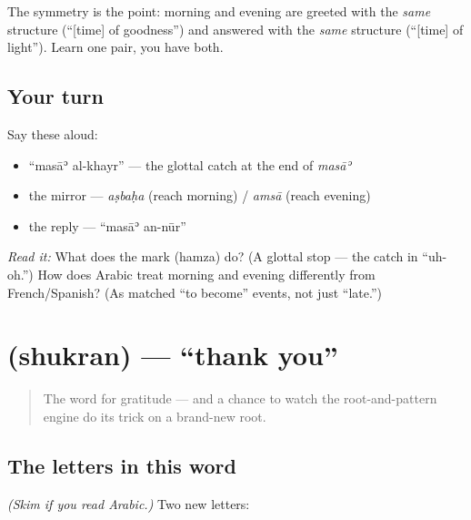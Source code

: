 \begin{culture}
The symmetry is the point: morning and evening are greeted with the \emph{same} structure (\textquotedblleft{}{[}time{]} of goodness\textquotedblright{}) and answered with the \emph{same} structure (\textquotedblleft{}{[}time{]} of light\textquotedblright{}). Learn one pair, you have both.
\end{culture}

\subsection*{Your turn}
Say these aloud:

\begin{itemize}
\raggedright
  \item \textquotedblleft{}masāʾ al-khayr\textquotedblright{} — the glottal catch at the end of \emph{masāʾ}
  \item the mirror — \emph{aṣbaḥa} (reach morning) / \emph{amsā} (reach evening)
  \item the reply — \textquotedblleft{}masāʾ an-nūr\textquotedblright{}
\end{itemize}

\begin{tcolorbox}[breakable,colback=teal!4,colframe=teal!35!black,title={Before you move on}]
\emph{Read it:} \textbf{ } What does the mark \textbf{} (hamza) do? (A glottal stop — the catch in \textquotedblleft{}uh-oh.\textquotedblright{}) How does Arabic treat morning and evening differently from French/Spanish? (As matched \textquotedblleft{}to become\textquotedblright{} events, not just \textquotedblleft{}late.\textquotedblright{})
\end{tcolorbox}
\section[\texorpdfstring{\ar{شكرا} (shukran)}{شكرا (shukran)}]{ (shukran) — \textquotedblleft{}thank you\textquotedblright{}}

\label{lesson:AR-C01-shukran}



\begin{quote}
The word for gratitude — and a chance to watch the root-and-pattern engine do its trick on a brand-new root.
\end{quote}

\subsection*{The letters in this word}
\emph{(Skim if you read Arabic.)} Two new letters:

